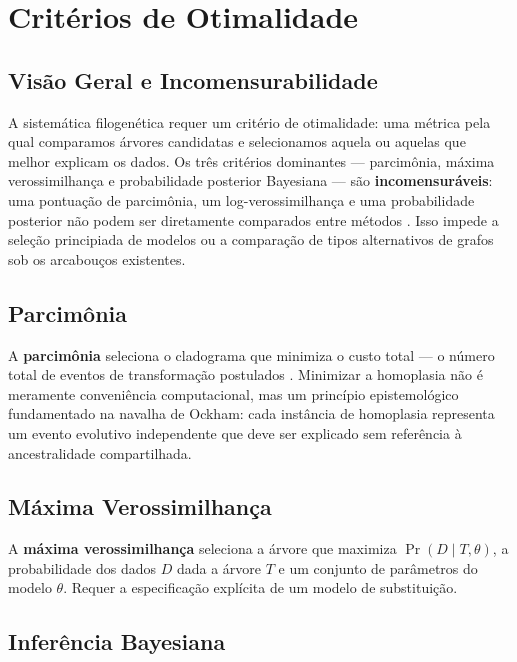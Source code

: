 \section{Critérios de Otimalidade}
\label{sec:criterios}

\subsection{Visão Geral e Incomensurabilidade}

A sistemática filogenética requer um critério de otimalidade: uma métrica pela qual comparamos árvores candidatas e selecionamos aquela ou aquelas que melhor explicam os dados. Os três critérios dominantes --- parcimônia, máxima verossimilhança e probabilidade posterior Bayesiana --- são \textbf{incomensuráveis}: uma pontuação de parcimônia, um log-verossimilhança e uma probabilidade posterior não podem ser diretamente comparados entre métodos \parencite{wheelervaron2025}. Isso impede a seleção principiada de modelos ou a comparação de tipos alternativos de grafos sob os arcabouços existentes.

\subsection{Parcimônia}

A \textbf{parcimônia} seleciona o cladograma que minimiza o custo total --- o número total de eventos de transformação postulados \parencite{farris1983,wheeleretal2006}. Minimizar a homoplasia não é meramente conveniência computacional, mas um princípio epistemológico fundamentado na navalha de Ockham: cada instância de homoplasia representa um evento evolutivo independente que deve ser explicado sem referência à ancestralidade compartilhada.

\subsection{Máxima Verossimilhança}

A \textbf{máxima verossimilhança} seleciona a árvore que maximiza $\Pr(D \mid T, \theta)$, a probabilidade dos dados $D$ dada a árvore $T$ e um conjunto de parâmetros do modelo $\theta$. Requer a especificação explícita de um modelo de substituição.

\subsection{Inferência Bayesiana}

